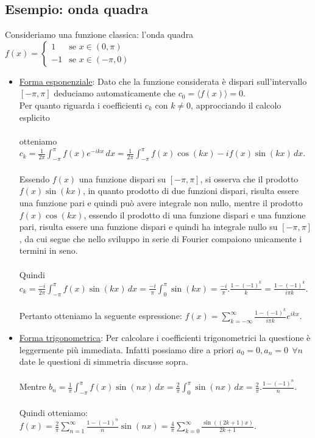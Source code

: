 \documentclass[a4paper,12pt]{report}
\begin{document}
\newpage

\subsection{Esempio: onda quadra}\label{sec: 3.4.3}

Consideriamo una funzione classica: l'onda quadra $f(x)=
\begin{cases}
1 & \text{se } x \in (0,\pi) \\
-1 & \text{se } x \in (-\pi,0)
\end{cases}$

\begin{itemize}
    \item \underline{Forma esponenziale}: Dato che la funzione considerata è dispari sull'intervallo $[-\pi,\pi]$ deduciamo automaticamente che $c_0=\langle f(x)\rangle =0$. 
    \\Per quanto riguarda i coefficienti $c_k$ con $k\neq 0$, approcciando il calcolo esplicito
    \\
    \\otteniamo $c_k=\displaystyle\frac{1}{2\pi}\int_{-\pi}^\pi f(x) e^{-ikx}\,dx=\frac{1}{2\pi}\int_{-\pi}^\pi f(x)\cos(kx)-if(x)\sin(kx)\,dx$. 
    \\
    \\Essendo $f(x)$ una funzione dispari su $[-\pi,\pi]$, si osserva che il prodotto $f(x)\sin(kx)$, in quanto prodotto di due funzioni dispari, risulta essere una funzione pari e quindi può avere integrale non nullo, mentre il prodotto $f(x)\cos(kx)$, essendo il prodotto di una funzione dispari e una funzione pari, risulta essere una funzione dispari e quindi ha integrale nullo su $[-\pi,\pi]$, da cui segue che nello sviluppo in serie di Fourier compaiono unicamente i termini in seno.
    \\
    \\Quindi $c_k=\displaystyle\frac{-i}{2\pi}\int_{-\pi}^\pi f(x)\sin (kx) \,dx=\frac{-i}{\pi}\int_0^\pi\sin(kx)=\frac{-i}{\pi}.\frac{1-(-1)^k}{k}=\frac{1-(-1)^k}{i\pi k}$.
    \\
    \\ Pertanto otteniamo la seguente espressione: $f(x)=\displaystyle\sum_{k=-\infty}^\infty\frac{1-(-1)^k}{i\pi k}e^{ikx}$.



    
    \item \underline{Forma trigonometrica}: Per calcolare i coefficienti trigonometrici la questione è leggermente più immediata. Infatti possiamo dire a priori $a_0=0, a_n=0\ \ \forall n$ date le questioni di simmetria discusse sopra. 
    \\
    \\Mentre $b_n=\displaystyle\frac{1}{\pi}\int_{-\pi}^\pi f(x)\sin(nx)\,dx=\frac{2}{\pi}\int_0^\pi \sin(nx)\,dx=\frac{2}{\pi}.\frac{1-(-1)^n}{n}$.
    \\
    \\ Quindi otteniamo: $f(x)=\displaystyle\frac{2}{\pi}\sum_{n=1}^\infty\frac{1-(-1)^n}{n}\sin(nx)=\frac{4}{\pi}\sum_{k=0}^\infty \frac{\sin ((2k+1)x)}{2k+1}$.
\end{itemize}
\end{document}
